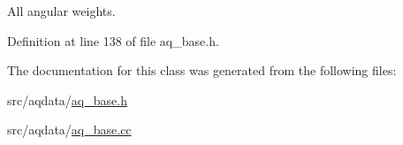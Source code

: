 All angular weights. 



Definition at line 138 of file aq\+\_\+base.\+h.



The documentation for this class was generated from the following files\+:\begin{DoxyCompactItemize}
\item 
src/aqdata/\hyperlink{aq__base_8h}{aq\+\_\+base.\+h}\item 
src/aqdata/\hyperlink{aq__base_8cc}{aq\+\_\+base.\+cc}\end{DoxyCompactItemize}
